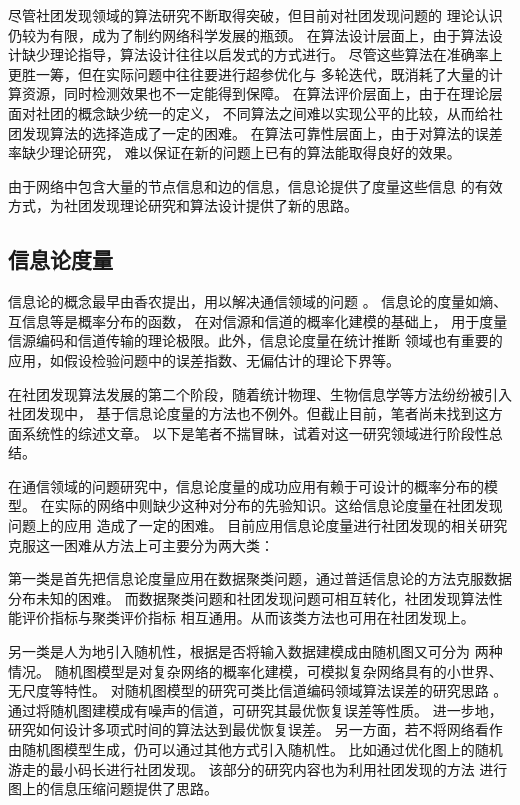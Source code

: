 
尽管社团发现领域的算法研究不断取得突破，但目前对社团发现问题的
理论认识仍较为有限，成为了制约网络科学发展的瓶颈。
在算法设计层面上，由于算法设计缺少理论指导，算法设计往往以启发式的方式进行。
尽管这些算法在准确率上更胜一筹，但在实际问题中往往要进行超参优化与
多轮迭代，既消耗了大量的计算资源，同时检测效果也不一定能得到保障。
在算法评价层面上，由于在理论层面对社团的概念缺少统一的定义，
不同算法之间难以实现公平的比较，从而给社团发现算法的选择造成了一定的困难。
在算法可靠性层面上，由于对算法的误差率缺少理论研究，
难以保证在新的问题上已有的算法能取得良好的效果。

由于网络中包含大量的节点信息和边的信息，信息论提供了度量这些信息
的有效方式，为社团发现理论研究和算法设计提供了新的思路。


\subsection{信息论度量}
信息论的概念最早由香农提出，用以解决通信领域的问题 \cite{shannon1948mathematical}。
信息论的度量如熵、互信息等是概率分布的函数，
在对信源和信道的概率化建模的基础上，
用于度量信源编码和信道传输的理论极限。此外，信息论度量在统计推断
领域也有重要的应用，如假设检验问题中的误差指数、无偏估计的理论下界等。

在社团发现算法发展的第二个阶段，随着统计物理、生物信息学等方法纷纷被引入社团发现中，
基于信息论度量的方法也不例外。但截止目前，笔者尚未找到这方面系统性的综述文章。
以下是笔者不揣冒昧，试着对这一研究领域进行阶段性总结。

在通信领域的问题研究中，信息论度量的成功应用有赖于可设计的概率分布的模型。
在实际的网络中则缺少这种对分布的先验知识。这给信息论度量在社团发现问题上的应用
造成了一定的困难。
目前应用信息论度量进行社团发现的相关研究克服这一困难从方法上可主要分为两大类：

第一类是首先把信息论度量应用在数据聚类问题，通过普适信息论的方法克服数据分布未知的困难\cite{raman20219}。
而数据聚类问题和社团发现问题可相互转化，社团发现算法性能评价指标与聚类评价指标
相互通用。从而该类方法也可用在社团发现上。

另一类是人为地引入随机性，根据是否将输入数据建模成由随机图又可分为
两种情况。
随机图模型是对复杂网络的概率化建模，可模拟复杂网络具有的小世界、无尺度等特性。
对随机图模型的研究可类比信道编码领域算法误差的研究思路 \cite{abbe2015community}。
通过将随机图建模成有噪声的信道，可研究其最优恢复误差等性质。
进一步地，研究如何设计多项式时间的算法达到最优恢复误差。
另一方面，若不将网络看作由随机图模型生成，仍可以通过其他方式引入随机性。
比如通过优化图上的随机游走的最小码长进行社团发现\cite{rosvall2008mcl}。
该部分的研究内容也为利用社团发现的方法
进行图上的信息压缩问题提供了思路\cite{abbe17sideinfo}。

